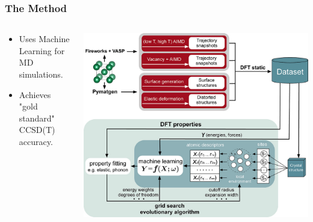 \begin{frame}
    \frametitle{The Method}
    \begin{columns}[T]
        \begin{column}{0.5\textwidth}
            \vspace{2cm}
            \begin{itemize}
                \item Uses Machine Learning for MD simulations.
                \item Achieves "gold standard" CCSD(T) accuracy.
            \end{itemize}
        \end{column}
        \begin{column}{0.45\textwidth}
            \includegraphics[width=\textwidth]{images/CCSD(T)1.jpeg}
        \end{column}
    \end{columns}
\end{frame}


